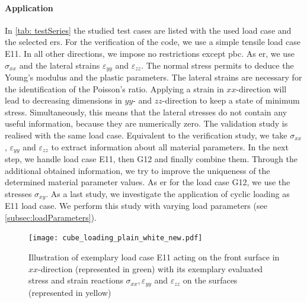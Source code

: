 \paragraph{Application}
In \autoref{tab: testSeries} the studied test cases are listed with the used load case and the selected \acrshort{er}s.
For the verification of the code, we use a simple tensile load case E11.
In all other directions, we impose no restrictions except \acrshort{pbc}. As \acrlong{er}, we use $\sigma_{xx}$ and the lateral strains $\varepsilon_{yy}$ and $\varepsilon_{zz}$. The normal stress permits to deduce the Young's modulus and the plastic parameters. The lateral strains are necessary for the identification of the Poisson's ratio. Applying a strain in $xx$-direction will lead to decreasing dimensions in $yy$- and $zz$-direction to keep a state of minimum stress. Simultaneously, this means that the lateral stresses do not contain any useful information, because they are numerically zero. 
The validation study is realised with the same load case. Equivalent to the verification study, we take $\sigma_{xx}$,  $\varepsilon_{yy}$ and $\varepsilon_{zz}$ to extract information about all material parameters. 
In the next step, we handle load case E11, then G12 and finally combine them. Through the additional obtained information, we try to improve the uniqueness of the determined material parameter values. As \acrlong{er} for the load case G12, we use the stresses $\sigma_{xy}$.
As a last study, we investigate the application of cyclic loading as E11 load case. We perform this study with varying load parameters (see \autoref{subsec:loadParameters}). 


\begin{figure}[H]
    \centering
    \texttt{[image: cube\_loading\_plain\_white\_new.pdf]}
    \caption{Illustration of exemplary load case E11 acting on the front surface in $xx$-direction (represented in green) with its exemplary evaluated stress and strain reactions $\sigma_{xx}, \varepsilon_{yy}$ and $\varepsilon_{zz}$ on the surfaces (represented in yellow)}
    \label{fig:evaluationMeasurements}
\end{figure}


